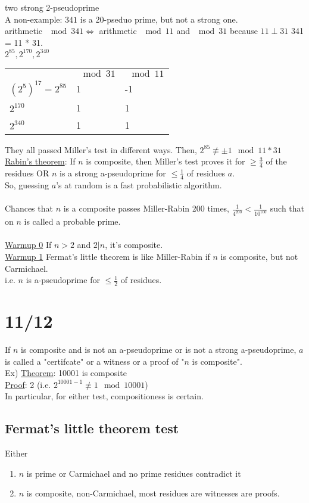 \documentclass[13pt]{article}
\begin{document}
	two strong 2-pseudoprime\\
	A non-example: $341$ is a 20-pseduo prime, but not a strong one.\\
	arithmetic $\mod 341 \Leftrightarrow$ arithmetic $\mod 11$ and $\mod 31$
	because $11 \perp 31$ 341 = 11 * 31.\\
	$2^{85}, 2^{170}, 2^{340}$\\
	\begin{tabular}{l l l}
	& $\mod 31$ & $\mod 11$\\
	$(2^5)^{17} = 2^{85}$ & 1 & -1\\
	$2^{170}$ & 1 & 1\\
	$2^{340}$ & 1 & 1\\
	\end{tabular}
	They all passed Miller's test in different ways. Then, $2^85 \not\equiv
	\pm 1 \mod 11*31$\\
	\underline{Rabin's theorem}: If $n$ is composite, then Miller's test
	proves it for $\ge \frac{3}{4}$ of the residues OR $n$ is a strong 
	a-pseudoprime for $\le \frac{1}{4}$ of residues $a$.\\
	So, guessing $a$'s at random is a fast probabilistic algorithm.\\\\
	Chances that $n$ is a composite passes Miller-Rabin 200 times,
	$\frac{1}{4^{200}} < \frac{1}{10^100}$ such that on $n$ is called a
	probable prime.\\\\
	\underline{Warmup 0} If $n > 2$ and $2 | n$, it's composite.\\
	\underline{Warmup 1} Fermat's little theorem is like Miller-Rabin if $n$
	is composite, but not Carmichael.\\
	i.e. $n$ is a-pseudoprime for $\le \frac{1}{2}$ of residues.

\section*{11/12}
	If $n$ is composite and is not an a-pseudoprime or is not a strong
	a-pseudoprime, $a$ is called a "certifcate" or a witness or a
	proof of "$n$ is composite".\\
	Ex) \underline{Theorem}: 10001 is composite\\
	\underline{Proof}: 2 (i.e. $2^{10001 - 1} \not\equiv 1 \mod 10001$)\\
	In particular, for either test, compositioness is certain.\\
	\subsection*{Fermat's little theorem test}
		Either 
		\begin{enumerate}
			\item $n$ is prime or Carmichael and no prime residues contradict
			it
			\item $n$ is composite, non-Carmichael, most residues are witnesses
			 are proofs.
		\end{enumerate}
\end{document}
